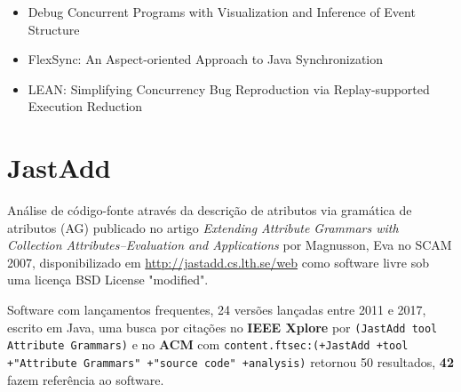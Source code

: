 \begin{itemize}
\item Debug Concurrent Programs with Visualization and Inference of Event Structure
\item FlexSync: An Aspect-oriented Approach to Java Synchronization
\item LEAN: Simplifying Concurrency Bug Reproduction via Replay-supported Execution Reduction
\end{itemize}

\section{JastAdd}

Análise de código-fonte através da descrição de atributos via gramática de atributos (AG)
publicado no artigo {\it Extending Attribute Grammars with Collection Attributes--Evaluation and Applications}
por Magnusson, Eva
no SCAM 2007,
disponibilizado em \url{http://jastadd.cs.lth.se/web}
como software livre
sob uma licença BSD License "modified".

Software com lançamentos frequentes,
24 versões lançadas
entre 2011 e 2017,
escrito em Java,
uma busca por citações no {\bf IEEE Xplore} por
\texttt{(JastAdd tool Attribute Grammars)}
e no {\bf ACM} com
\texttt{content.ftsec:(+JastAdd +tool +"Attribute Grammars" +"source code" +analysis)}
retornou
50 resultados,
{\bf 42} fazem referência ao software.

